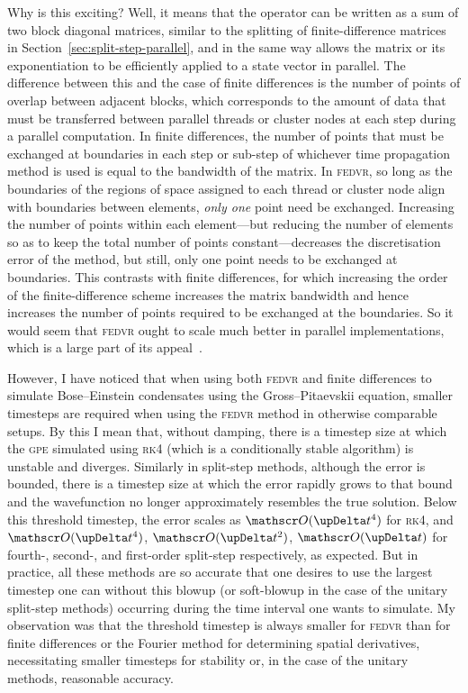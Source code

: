 Why is this exciting? Well, it means that the operator can be written as a sum of two block diagonal matrices, similar to the splitting of finite-difference matrices in Section~\ref{sec:split-step-parallel}, and in the same way allows the matrix or its exponentiation to be efficiently applied to a state vector in parallel. The difference between this and the case of finite differences is the number of points of overlap between adjacent blocks, which corresponds to the amount of data that must be transferred between parallel threads or cluster nodes at each step during a parallel computation. In finite differences, the number of points that must be exchanged at boundaries in each step or sub-step of whichever time propagation method is used is equal to the bandwidth of the matrix. In \textsc{fedvr}, so long as the boundaries of the regions of space assigned to each thread or cluster node align with boundaries between elements, \emph{only one} point need be exchanged. Increasing the number of points within each element---but reducing the number of elements so as to keep the total number of points constant---decreases the discretisation error of the method, but still, only one point needs to be exchanged at boundaries. This contrasts with finite differences, for which increasing the order of the finite-difference scheme increases the matrix bandwidth and hence increases the number of points required to be exchanged at the boundaries. So it would seem that \textsc{fedvr} ought to scale much better in parallel implementations, which is a large part of its appeal~\cite{schneider_discrete_2005,schneider_parallel_2006}.

However, I have noticed that when using both \textsc{fedvr} and finite differences to simulate Bose--Einstein condensates using the Gross--Pitaevskii equation, smaller timesteps are required when using the \textsc{fedvr} method in otherwise comparable setups. By this I mean that, without damping, there is a timestep size at which the \textsc{gpe} simulated using \textsc{rk4} (which is a conditionally stable algorithm) is unstable and diverges. Similarly in split-step methods, although the error is bounded, there is a timestep size at which the error rapidly grows to that bound and the wavefunction no longer approximately resembles the true solution. Below this threshold timestep, the error scales as $\Ord{\upDelta t^4}$ for \textsc{rk4}, and $\Ord{\upDelta t^4}$, $\Ord{\upDelta t^2}$, $\Ord{\upDelta t}$ for fourth-, second-, and first-order split-step respectively, as expected. But in practice, all these methods are so accurate that one desires to use the largest timestep one can without this blowup (or soft-blowup in the case of the unitary split-step methods) occurring during the time interval one wants to simulate. My observation was that the threshold timestep is always smaller for \textsc{fedvr} than for finite differences or the Fourier method for determining spatial derivatives, necessitating smaller timesteps for stability or, in the case of the unitary methods, reasonable accuracy.

